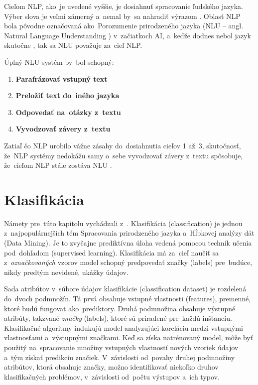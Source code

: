 Cieľom NLP, ako~je uvedené vyššie, je dosiahnuť spracovanie ľudského jazyka. Výber slova  je veľmi zámerný a~nemal by~sa nahradiť výrazom . Oblasť NLP bola pôvodne označovaná ako~Porozumenie prirodzeného jazyka (NLU -- angl. Natural Language Understanding ) v~začiatkoch AI, a~keďže dodnes nebol jazyk skutočne , tak sa NLU považuje za~cieľ NLP. 

Úplný NLU systém by~bol schopný:

\begin{enumerate}
    \item \textbf{Parafrázovať vstupný text}
    \item \textbf{Preložiť text do~iného jazyka}
    \item \textbf{Odpovedať na~otázky z~textu}
    \item \textbf{Vyvodzovať závery z~textu}
\end{enumerate}

Zatiaľ čo NLP urobilo vážne zásahy do~dosiahnutia cieľov 1 až~3, skutočnosť, že~NLP systémy nedokážu samy o~sebe vyvodzovať závery z~textu spôsobuje, že~cieľom NLP stále zostáva NLU \cite{Liddy:2001}.

\section{Klasifikácia}
\label{klasifikacia}

Námety pre~túto kapitolu vychádzali z~\cite{Herrera:2016}. Klasifikácia (classification) je jednou z~najpopulárnejších tém Spracovania prirodzeného jazyka a~Hĺbkovej analýzy dát (Data Mining). Je to zvyčajne prediktívna úloha vedená pomocou techník učenia pod~dohľadom (supervised learning). Klasifikácia má za~cieľ naučiť sa z~\textit{označkovaných} vzorov model schopný predpovedať značky (labels) pre~budúce, nikdy predtým nevidené, ukážky údajov.

Sada atribútov v~súbore údajov klasifikácie (classification dataset) je rozdelená do~dvoch podmnožín. Tá prvá obsahuje vstupné vlastnosti (features), premenné, ktoré budú fungovať ako~prediktory. Druhá podmnožina obsahuje výstupné atribúty, takzvané \textit{značky} (labels), ktoré sú priradené pre~každú inštanciu. Klasifikačné algoritmy indukujú model analyzujúci koreláciu medzi vstupnými vlastnosťami a~výstupnými značkami. Keď sa získa natrénovaný model, môže byť použitý na~spracovanie množiny vstupných vlastností nových vzoriek údajov a~tým získať predikciu značiek. V~závislosti od~povahy druhej podmnožiny atribútov, ktorá obsahuje značky, možno identifikovať niekoľko druhov klasifikačných problémov, v~závislosti od~počtu výstupov a~ich typov. 

